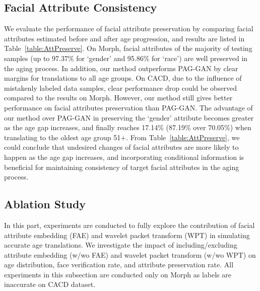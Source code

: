 \documentclass[10pt,twocolumn,letterpaper]{article}
\begin{document}
\subsection{Facial Attribute Consistency}
We evaluate the performance of facial attribute preservation by comparing facial attributes estimated before and after age progression, and results are listed in Table~\ref{table:AttPreserve}. 
On Morph, facial attributes of the majority of testing samples (up to 97.37\% for `gender' and 95.86\% for `race') are well preserved in the aging process. In addition, our method outperforms PAG-GAN by clear margins for translations to all age groups. 
On CACD, due to the influence of mistakenly labeled data samples, clear performance drop could be observed compared to the results on Morph. However, our method still gives better performance on facial attributes preservation than PAG-GAN. The advantage of our method over PAG-GAN in preserving the `gender' attribute becomes greater as the age gap increases, and finally reaches 17.14\% (87.19\% over 70.05\%) when translating to the oldest age group 51+. 
From Table~\ref{table:AttPreserve}, we could conclude that undesired changes of facial attributes are more likely to happen as the age gap increases, and incorporating conditional information is beneficial for maintaining consistency of target facial attributes in the aging process.

\subsection{Ablation Study}

In this part, experiments are conducted to fully explore the contribution of facial attribute embedding (FAE) and wavelet packet transform (WPT) in simulating accurate age translations. 
We investigate the impact of including/excluding attribute embedding (w/wo FAE) and wavelet packet transform (w/wo WPT) on age distribution, face verification rate, and attribute preservation rate. 
All experiments in this subsection are conducted only on Morph as labels are inaccurate on CACD dataset. 
\end{document}
